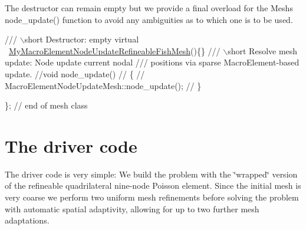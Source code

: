 The destructor can remain empty but we provide a final overload for the {\ttfamily Mesh\textquotesingle{}s} {\ttfamily node\+\_\+update()} function to avoid any ambiguities as to which one is to be used. 
\begin{DoxyCodeInclude}
\textcolor{comment}{}
\textcolor{comment}{ /// \(\backslash\)short Destructor: empty}
\textcolor{comment}{} \textcolor{keyword}{virtual} ~\hyperlink{classMyMacroElementNodeUpdateRefineableFishMesh}{MyMacroElementNodeUpdateRefineableFishMesh}()\{\}
\textcolor{comment}{}
\textcolor{comment}{ /// \(\backslash\)short Resolve mesh update: Node update current nodal}
\textcolor{comment}{ /// positions via sparse MacroElement-based update.}
\textcolor{comment}{} \textcolor{comment}{//void node\_update()}
 \textcolor{comment}{// \{}
 \textcolor{comment}{//  MacroElementNodeUpdateMesh::node\_update();}
 \textcolor{comment}{// \}}

\}; \textcolor{comment}{// end of mesh class}

\end{DoxyCodeInclude}




 

\hypertarget{index_main}{}\section{The driver code}\label{index_main}
The driver code is very simple\+: We build the problem with the \char`\"{}wrapped\char`\"{} version of the refineable quadrilateral nine-\/node Poisson element. Since the initial mesh is very coarse we perform two uniform mesh refinements before solving the problem with automatic spatial adaptivity, allowing for up to two further mesh adaptations.


